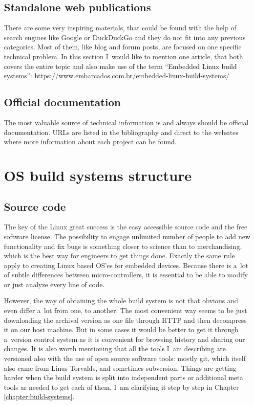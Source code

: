 \documentclass[printmode]{mgr}
\begin{document}
\subsection*{Standalone web publications}

There are some very inspiring materials, that could be found with the help of search engines like Google or DuckDuckGo and they do not fit into any previous categories.
Most of them, like blog and forum posts, are focused on one specific technical problem.
In this section I~would like to mention one article, that both covers the entire topic and also make use of the term ``Embedded Linux build systems'': \url{https://www.embarcados.com.br/embedded-linux-build-systems/}

\subsection*{Official documentation}
The most valuable source of technical information is and always should be official documentation. URLs are listed in the bibliography and direct to the websites where more information about each project can be found.



\section{OS build systems structure}
\label{section:builders-structure}

\subsection{Source code}

The key of the Linux great success is the easy accessible source code and the free software license. The possibility to engage unlimited number of people to add new functionality and fix bugs is something closer to science than to merchandising, which is the best way for engineers to get things done. Exactly the same rule apply to creating Linux based OS'es for embedded devices. Because there is a~lot of subtle differences between micro-controllers, it is essential to be able to modify or just analyze every line of code.

However, the way of obtaining the whole build system is not that obvious and even differ a~lot from one, to another. The most convenient way seems to be just downloading the archival version as one file through HTTP and then decompress it on our host machine. But in some cases it would be better to get it through a~version control system as it is convenient for browsing history and sharing our changes. It is also worth mentioning that all the tools I~am describing are versioned also with the use of open source software tools: mostly git, which itself also came from Linus Torvalds, and sometimes subversion. Things are getting harder when the build system is split into independent parts or additional meta tools ar needed to get each of them. I~am clarifying it step by step in Chapter \ref{chapter:build-systems}.
\end{document}
